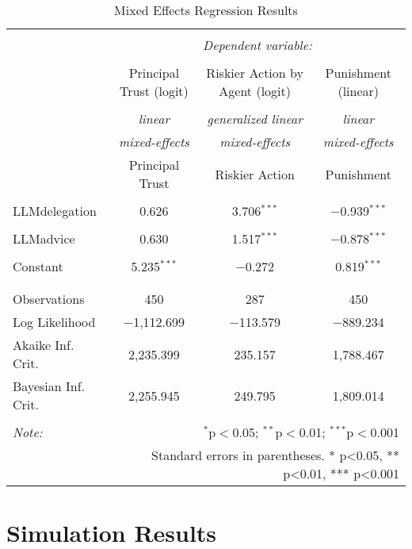 \documentclass[
]{article}
\begin{document}
\begin{table}[!htbp] \centering 
  \caption{Mixed Effects Regression Results} 
  \label{} 
\begin{tabular}{@{\extracolsep{5pt}}lccc} 
\\[-1.8ex]\hline 
\hline \\[-1.8ex] 
 & \multicolumn{3}{c}{\textit{Dependent variable:}} \\ 
\cline{2-4} 
\\[-1.8ex] & Principal Trust (logit) & Riskier Action by Agent (logit) & Punishment (linear) \\ 
\\[-1.8ex] & \textit{linear} & \textit{generalized linear} & \textit{linear} \\ 
 & \textit{mixed-effects} & \textit{mixed-effects} & \textit{mixed-effects} \\ 
 & Principal Trust & Riskier Action & Punishment \\ 
\hline \\[-1.8ex] 
 LLMdelegation & 0.626 & 3.706$^{***}$ & $-$0.939$^{***}$ \\ 
  & & & \\ 
 LLMadvice & 0.630 & 1.517$^{***}$ & $-$0.878$^{***}$ \\ 
  & & & \\ 
 Constant & 5.235$^{***}$ & $-$0.272 & 0.819$^{***}$ \\ 
  & & & \\ 
\hline \\[-1.8ex] 
Observations & 450 & 287 & 450 \\ 
Log Likelihood & $-$1,112.699 & $-$113.579 & $-$889.234 \\ 
Akaike Inf. Crit. & 2,235.399 & 235.157 & 1,788.467 \\ 
Bayesian Inf. Crit. & 2,255.945 & 249.795 & 1,809.014 \\ 
\hline 
\hline \\[-1.8ex] 
\textit{Note:}  & \multicolumn{3}{r}{$^{*}$p$<$0.05; $^{**}$p$<$0.01; $^{***}$p$<$0.001} \\ 
 & \multicolumn{3}{r}{Standard errors in parentheses. * p<0.05, ** p<0.01, *** p<0.001} \\ 
\end{tabular} 
\end{table}

\section{Simulation Results}\label{simulation-results}
\end{document}
